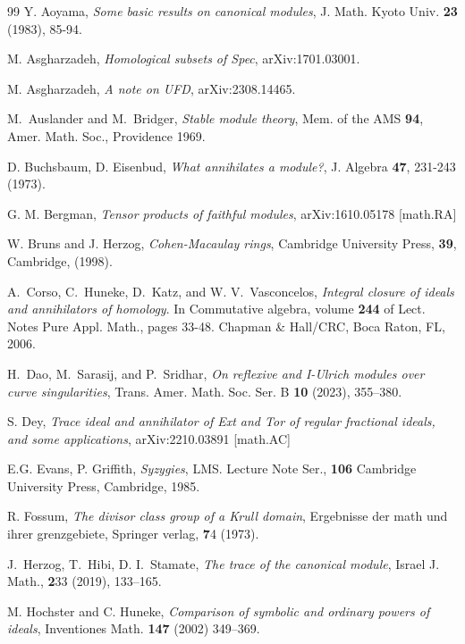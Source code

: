 \documentclass[11pt,a4paper]{amsart}
\numberwithin{equation}{section}
\begin{document}
\begin{thebibliography}{99}
	Y. Aoyama, {\it Some basic results on canonical modules}, J. Math. Kyoto Univ.
{\bf 23} (1983), 85-94.
	
M. Asgharzadeh,
{\it Homological subsets of  Spec}, arXiv:1701.03001.

 M. Asgharzadeh, {\it A note on UFD},
arXiv:2308.14465.



M.~Auslander and M.~Bridger, \emph{Stable module theory}, Mem. of
the AMS  {\bf94}, Amer. Math. Soc., Providence 1969.

D. Buchsbaum, D. Eisenbud, \emph{What annihilates a module?}, J. Algebra {\bf47}, 231-243 (1973).

G. M. Bergman, \emph{
Tensor products of faithful modules}, arXiv:1610.05178 [math.RA]
	
	W. Bruns and J. Herzog,  \emph{Cohen-Macaulay rings}, Cambridge University Press, {\bf{39}}, Cambridge, (1998).
	
A.~Corso, C.~Huneke, D.~Katz, and W. V.~Vasconcelos, \emph{Integral closure of
	ideals and annihilators of homology}. In Commutative algebra, volume  {\bf244} of Lect. Notes Pure
Appl. Math., pages 33-48. Chapman \& Hall/CRC, Boca Raton, FL, 2006.

 	
 	H.~Dao, M.~Sarasij, and P.~Sridhar,  \emph{On reflexive and I-Ulrich modules over curve singularities}, Trans. Amer. Math. Soc. Ser. B {\bf10} (2023), 355–380.


S. Dey, \emph{
Trace ideal and annihilator of Ext and Tor of regular fractional ideals, and some applications}, arXiv:2210.03891 [math.AC]


 E.G.
Evans,   P. Griffith,   \emph{Syzygies},
LMS. Lecture Note Ser., \textbf{106}
Cambridge University Press, Cambridge, 1985.


 R. Fossum, \emph{The divisor class group of a Krull domain}, Ergebnisse der math und ihrer grenzgebiete, Springer verlag,  {\textbf 74} (1973). 

J.~Herzog, T.~Hibi, D. I.~Stamate, \emph{The trace of the canonical module}, Israel J. Math., {\textbf 233} (2019), 133--165.

M. Hochster and C. Huneke, \emph{Comparison of symbolic and ordinary powers of
	ideals}, Inventiones Math.  {\bf147} (2002) 349–369.


\end{thebibliography}
\end{document}
